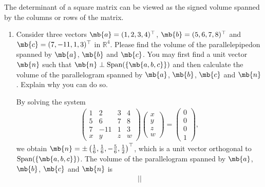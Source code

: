 \begin{exercise}
    The determinant of a square matrix can be viewed as the signed volume spanned by the columns or rows of the matrix.
    \begin{enumerate}
        \item Consider three vectors $\mb{a}=(1,2,3,4)^\top$, $\mb{b}=(5,6,7,8)^\top$ and $\mb{c}=(7,-11,1,3)^\top$ in $\mathbb{R}^4$. Please find the volume of the parallelepipedon spanned by $\mb{a}$, $\mb{b}$ and $\mb{c}$. You may first find a unit vector $\mb{n}$ such that $\mb{n}\perp \text{Span}(\{\mb{a,b,c}\})$ and then calculate the volume of the parallelogram spanned by $\mb{a}$, $\mb{b}$, $\mb{c}$ and $\mb{n}$. Explain why you can do so.
            \begin{solution}
                By solving the system
                \begin{align*}
                    \begin{pmatrix}
                        1 & 2   & 3 & 4  \\
                        5 & 6   & 7 & 8  \\
                        7 & -11 & 1 & 3  \\
                        x & y   & z & w
                    \end{pmatrix}
                    \begin{pmatrix}
                        x \\
                        y \\
                        z \\
                        w
                    \end{pmatrix}
                    =
                    \begin{pmatrix}
                        0 \\
                        0 \\
                        0 \\
                        1
                    \end{pmatrix},
                \end{align*}
                we obtain $\mb{n}=\pm\left(\frac{1}{6},\frac{1}{6},-\frac{5}{6},\frac{1}{2}\right)^\top$, which is a unit vector orthogonal to $\text{Span}(\{\mb{a,b,c}\})$. The volume of the parallelogram spanned by $\mb{a}$, $\mb{b}$, $\mb{c}$ and $\mb{n}$ is
                \begin{align*}
                    \left|\left|

\end{align*}
\end{solution}
\end{enumerate}
\end{exercise}
